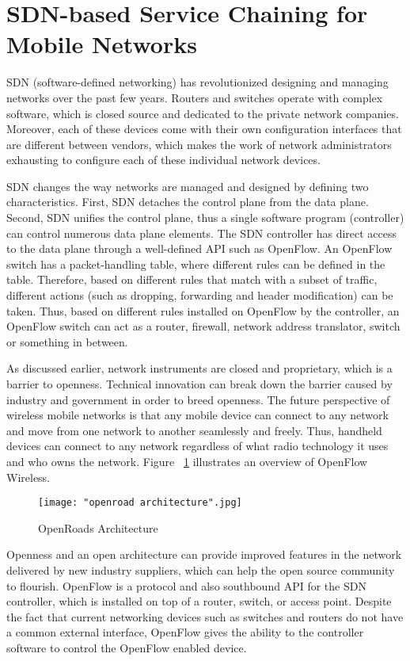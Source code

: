 \section{SDN-based Service Chaining for Mobile Networks}

SDN (software-defined networking) has revolutionized designing and managing networks over the past few years. Routers and switches operate with complex software, which is closed source and dedicated to the private network companies. Moreover, each of these devices come with their own configuration interfaces that are different between vendors, which makes the work of network administrators exhausting to configure each of these individual network devices. \cite{FRZ13}

SDN changes the way networks are managed and designed by defining two characteristics. First, SDN detaches the control plane from the data plane. Second, SDN unifies the control plane, thus a single software program (controller) can control numerous data plane elements. The SDN controller has direct access to the data plane through a well-defined API such as OpenFlow. An OpenFlow switch has a packet-handling table, where different rules can be defined in the table. Therefore, based on different rules that match with a subset of traffic, different actions (such as dropping, forwarding and header modification) can be taken. Thus, based on different rules installed on OpenFlow by the controller, an OpenFlow switch can act as a router, firewall, network address translator, switch or something in between. 

As discussed earlier, network instruments are closed and proprietary, which is a barrier to openness. Technical innovation can break down the barrier caused by industry and government in order to breed openness. The future perspective of wireless mobile networks is that any mobile device can connect to any network and move from one network to another seamlessly and freely. Thus, handheld devices can connect to any network regardless of what radio technology it uses and who owns the network. Figure ~\ref{fig:openroads} illustrates an overview of OpenFlow Wireless. \cite{Yap10a}

\begin{figure}[h!t]
\centering
{}
\texttt{[image: "openroad architecture".jpg]}
\caption{OpenRoads Architecture \cite{Yap10b}}
\label{fig:openroads}
\end{figure}

Openness and an open architecture can provide improved features in the network delivered by new industry suppliers, which can help the open source community to flourish. OpenFlow is a protocol and also southbound API for the SDN controller, which is installed on top of a router, switch, or access point. Despite the fact that current networking devices such as switches and routers do not have a common external interface, OpenFlow gives the ability to the controller software to control the OpenFlow enabled device. 

